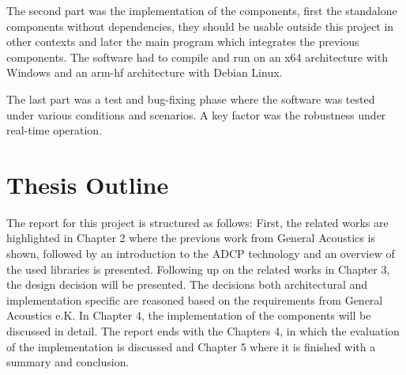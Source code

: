 The second part was the implementation of the components, first the standalone components without dependencies, they should be usable outside this project in other contexts and later the main program which integrates the previous components. The software had to compile and run on an x64 architecture with Windows and an arm-hf architecture with Debian Linux.

The last part was a test and bug-fixing phase where the software was tested under various conditions and scenarios. A key factor was the robustness under real-time operation.  %

\section{Thesis Outline}
The report for this project is structured as follows: First, the related works are highlighted in Chapter 2 where the previous work from General Acoustics is shown, followed by an introduction to the ADCP technology and an overview of the used libraries is presented. Following up on the related works in Chapter 3, the design decision will be presented. The decisions both architectural and implementation specific are reasoned based on the requirements from General Acoustics e.K. In Chapter 4, the implementation of the components will be discussed in detail. The report ends with the Chapters 4, in which the evaluation of the implementation is discussed and Chapter 5 where it is finished with a summary and conclusion.

